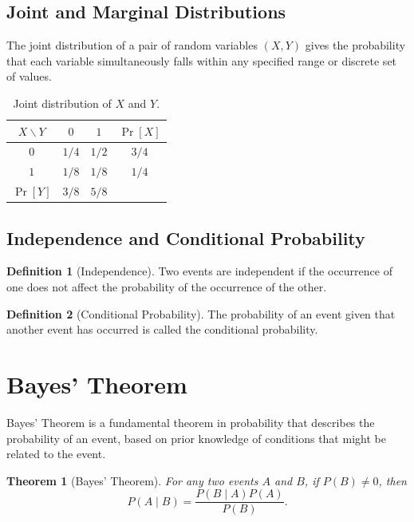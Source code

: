 \documentclass[12pt,openany]{book}
\newtheorem{theorem}{Theorem}[chapter]
\theoremstyle{definition}
\newtheorem{definition}{Definition}[chapter]
\begin{document}
	\subsection{Joint and Marginal Distributions}
	The joint distribution of a pair of random variables $(X, Y)$ gives the probability that each variable simultaneously falls within any specified range or discrete set of values.
	
	\begin{table}[ht]
		\centering
		\begin{tabular}{c|cc|c}
			\toprule
			$X\backslash Y$ & $0$ & $1$ & $\Pr[X]$ \\
			\midrule
			$0$ & $1/4$ & $1/2$ & $3/4$ \\
			$1$ & $1/8$ & $1/8$ & $1/4$ \\
			\midrule
			$\Pr[Y]$ & $3/8$ & $5/8$ & \\
			\bottomrule
		\end{tabular}
		\caption{Joint distribution of $X$ and $Y$.}
		\label{tab:joint_dist}
	\end{table}
	
	\subsection{Independence and Conditional Probability}
	\begin{definition}[Independence]
		Two events are independent if the occurrence of one does not affect the probability of the occurrence of the other.
	\end{definition}
	
	\begin{definition}[Conditional Probability]
		The probability of an event given that another event has occurred is called the conditional probability.
	\end{definition}
	
	\section{Bayes' Theorem}
	Bayes' Theorem is a fundamental theorem in probability that describes the probability of an event, based on prior knowledge of conditions that might be related to the event.
	
	\begin{theorem}[Bayes' Theorem]
		\label{thm:bayes}
		For any two events $A$ and $B$, if $P(B) \neq 0$, then
		\[
		P(A\mid B) = \frac{P(B\mid A)P(A)}{P(B)}.
		\]
	\end{theorem}
	
\end{document}
